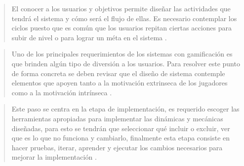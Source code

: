     \begin{quote}
        El conocer a los usuarios y objetivos permite diseñar las actividades que tendrá
        el sistema y cómo será el flujo de ellas. Es necesario contemplar los ciclos puesto
        que es común que los usuarios repitan ciertas acciones para subir de nivel o para
        lograr un méta en el sistema \cite[p. 66]{ForTheWin}.
    \end{quote}
    
    
    
    \begin{quote}
        Uno de los principales requerimientos de los sistemas con gamificación es que brinden
        algún tipo de diversión a los usuarios. Para resolver este punto de forma concreta se
        deben revisar que el diseño de sistema contemple elementos que apoyen tanto a la
        motivación extrinseca de los jugadores como a la motivación intrínseca \cite[p. 68]{ForTheWin}. 
    \end{quote}
    
    
    \begin{quote}
        Este paso se centra en la etapa de implementación, es requerido escoger las herramientas
        apropiadas para implementar las dinámicas y mecánicas diseñadas, para esto se tendrán
        que seleccionar qué incluir o excluir, ver que es lo que no funciona y cambiarlo,
        finalmente esta etapa consiste en hacer pruebas, iterar, aprender y ejecutar los
        cambios necesarios para mejorar la implementación \cite[p. 69]{ForTheWin}.
    \end{quote}
     

